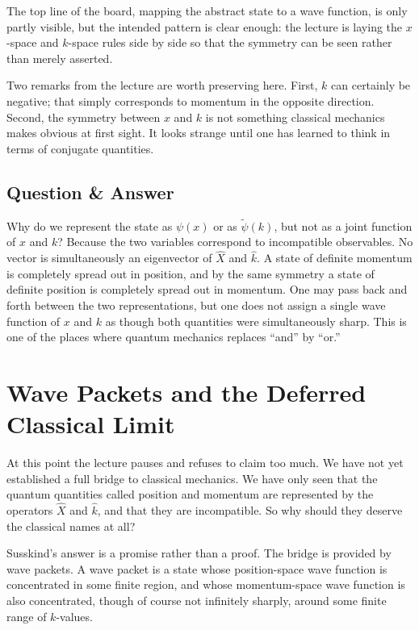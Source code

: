 The top line of the board, mapping the abstract state to a wave function, is only partly visible, but the intended pattern is clear enough: the lecture is laying the \(x\)-space and \(k\)-space rules side by side so that the symmetry can be seen rather than merely asserted.

Two remarks from the lecture are worth preserving here. First, \(k\) can certainly be negative; that simply corresponds to momentum in the opposite direction. Second, the symmetry between \(x\) and \(k\) is not something classical mechanics makes obvious at first sight. It looks strange until one has learned to think in terms of conjugate quantities.

\subsection{Question \& Answer}

Why do we represent the state as \(\psi(x)\) or as \(\tilde\psi(k)\), but not as a joint function of \(x\) and \(k\)? Because the two variables correspond to incompatible observables. No vector is simultaneously an eigenvector of \(\hat X\) and \(\hat k\). A state of definite momentum is completely spread out in position, and by the same symmetry a state of definite position is completely spread out in momentum. One may pass back and forth between the two representations, but one does not assign a single wave function of \(x\) and \(k\) as though both quantities were simultaneously sharp. This is one of the places where quantum mechanics replaces ``and'' by ``or.''

\section{Wave Packets and the Deferred Classical Limit}

At this point the lecture pauses and refuses to claim too much. We have not yet established a full bridge to classical mechanics. We have only seen that the quantum quantities called position and momentum are represented by the operators \(\hat X\) and \(\hat k\), and that they are incompatible. So why should they deserve the classical names at all?

Susskind's answer is a promise rather than a proof. The bridge is provided by wave packets. A wave packet is a state whose position-space wave function is concentrated in some finite region, and whose momentum-space wave function is also concentrated, though of course not infinitely sharply, around some finite range of \(k\)-values.

